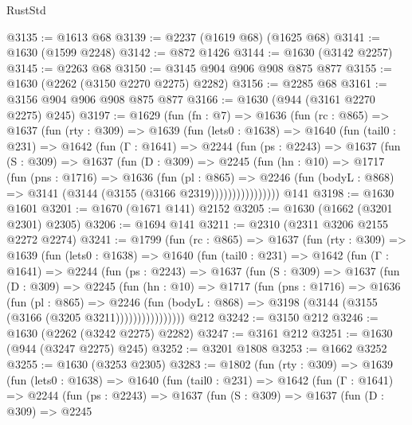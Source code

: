 \begin{lexlean}{RustStd}
\begin{coremodule}
@3135 := @1613 @68
@3139 := @2237 (@1619 @68) (@1625 @68)
@3141 := @1630 (@1599 @2248)
@3142 := @872 @1426
@3144 := @1630 (@3142 @2257)
@3145 := @2263 @68
@3150 := @3145 @904 @906 @908 @875 @877
@3155 := @1630 (@2262 (@3150 @2270 @2275) @2282)
@3156 := @2285 @68
@3161 := @3156 @904 @906 @908 @875 @877
@3166 := @1630 (@944 (@3161 @2270 @2275) @245)
@3197 := @1629
    (fun (fn : @7) =>
    @1636
      (fun (rc : @865) =>
      @1637
        (fun (rty : @309) =>
        @1639
          (fun (lets0 : @1638) =>
          @1640
            (fun (tail0 : @231) =>
            @1642
              (fun (Γ : @1641) =>
              @2244
                (fun (ps : @2243) =>
                @1637
                  (fun (S : @309) =>
                  @1637
                    (fun (D : @309) =>
                    @2245
                      (fun (hn : @10) =>
                      @1717
                        (fun (pns : @1716) =>
                        @1636
                          (fun (pl : @865) =>
                          @2246
                            (fun (bodyL : @868) => @3141 (@3144 (@3155 (@3166 @2319))))))))))))))))
    @141
@3198 := @1630 @1601
@3201 := @1670 (@1671 @141) @2152
@3205 := @1630 (@1662 (@3201 @2301) @2305)
@3206 := @1694 @141
@3211 := @2310 (@2311 @3206 @2155 @2272 @2274)
@3241 := @1799
    (fun (rc : @865) =>
    @1637
      (fun (rty : @309) =>
      @1639
        (fun (lets0 : @1638) =>
        @1640
          (fun (tail0 : @231) =>
          @1642
            (fun (Γ : @1641) =>
            @2244
              (fun (ps : @2243) =>
              @1637
                (fun (S : @309) =>
                @1637
                  (fun (D : @309) =>
                  @2245
                    (fun (hn : @10) =>
                    @1717
                      (fun (pns : @1716) =>
                      @1636
                        (fun (pl : @865) =>
                        @2246
                          (fun (bodyL : @868) =>
                          @3198 (@3144 (@3155 (@3166 (@3205 @3211))))))))))))))))
    @212
@3242 := @3150 @212
@3246 := @1630 (@2262 (@3242 @2275) @2282)
@3247 := @3161 @212
@3251 := @1630 (@944 (@3247 @2275) @245)
@3252 := @3201 @1808
@3253 := @1662 @3252
@3255 := @1630 (@3253 @2305)
@3283 := @1802
    (fun (rty : @309) =>
    @1639
      (fun (lets0 : @1638) =>
      @1640
        (fun (tail0 : @231) =>
        @1642
          (fun (Γ : @1641) =>
          @2244
            (fun (ps : @2243) =>
            @1637
              (fun (S : @309) =>
              @1637
                (fun (D : @309) =>
                @2245

\end{coremodule}
\end{lexlean}

